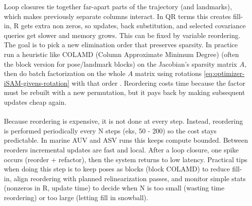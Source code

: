 Loop closures tie together far-apart parts of the trajectory (and landmarks), which makes previously separate columns interact. In QR terms this creates fill-in, R gets extra non zeros, so updates, back substitution, and selected covariance queries get slower and memory grows. This can be fixed by variable reordering. The goal is to pick a new elimination order that preserves sparsity. In practice run a heuristic like COLAMD (Column Approximate Minimum Degree) (often the block version for pose/landmark blocks) on the Jacobian's sparsity matrix $A$, then do batch factorization on the whole $A$ matrix using rotations \eqref{eq:optimizer-iSAM-givens-rotation} with that order \cite{iSAM_paper}. Reordering costs time because the factor must be rebuilt with a new permutation, but it pays back by making subsequent updates cheap again.
\\ \\
Because reordering is expensive, it is not done at every step. Instead, reordering is performed periodically every N steps (eks, 50 - 200) so the cost stays predictable. In marine AUV and ASV runs this keeps compute bounded. Between reorders incremental updates are fast and local. After a loop closure, one spike occurs (reorder + refactor), then the system returns to low latency. Practical tips when doing this step is to keep poses as blocks (block COLAMD) to reduce fill-in, align reordering with planned relinearization passes, and monitor simple stats (nonzeros in R, update time) to decide when N is too small (wasting time reordering) or too large (letting fill in snowball).  



